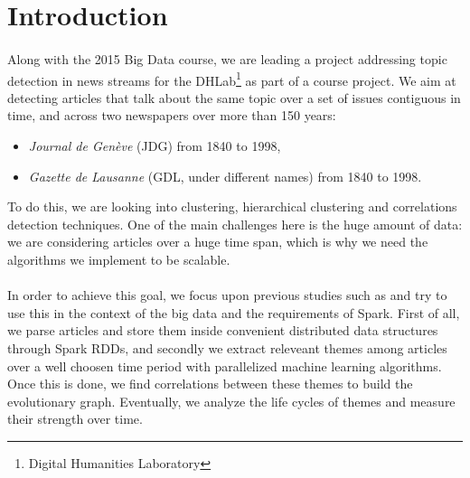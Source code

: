 \section{Introduction}
\paragraph{}
Along with the 2015 Big Data course, we are leading a project addressing topic detection in news streams for the DHLab\footnote{Digital Humanities Laboratory} as part of a course project. We aim at detecting articles that talk about the same topic over a set of issues contiguous in time, and across two newspapers over more than 150 years:
\begin{itemize}
\item \emph{Journal de Genève} (JDG) from 1840 to 1998,
\item \emph{Gazette de Lausanne} (GDL, under different names) from 1840 to 1998.
\end{itemize}
To do this, we are looking into clustering, hierarchical clustering and correlations detection techniques. One of the main challenges here is the huge amount of data: we are considering articles over a huge time span, which is why we need the algorithms we implement to be scalable.

\paragraph{}
In order to achieve this goal, we focus upon previous studies such as \cite{kdd05-ttm} and try to use this in the context of the big data and the requirements of Spark.
First of all, we parse articles and store them inside convenient distributed data structures through Spark RDDs, and secondly we extract releveant themes among articles over a well choosen time period with parallelized machine learning algorithms. Once this is done, we find correlations between these themes to build the evolutionary graph. Eventually, we analyze the life cycles of themes and measure their strength over time.
